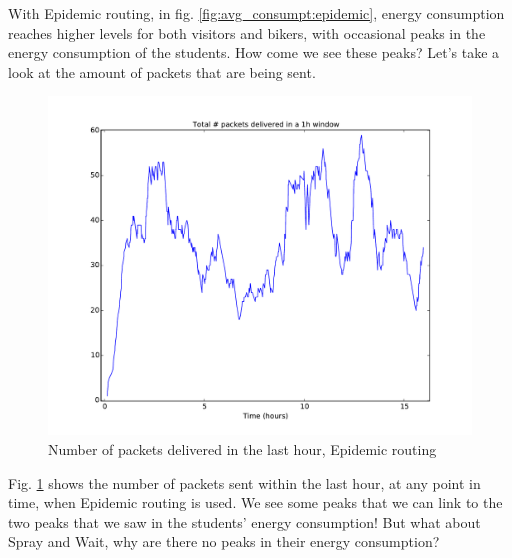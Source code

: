 \documentclass[conference]{IEEEtran}
\begin{document}
With Epidemic routing, in fig. \ref{fig:avg_consumpt:epidemic}, energy consumption reaches higher levels for both visitors and bikers, with occasional peaks in the energy consumption of the students. How come we see these peaks? Let's take a look at the amount of packets that are being sent.

\begin{figure}
  \includegraphics[scale=0.25, center]{../one_1.5.1-RC2/plots/Epidemic_NUM_DELIVERED_PKTS_IN_WND.pdf}
  \caption{Number of packets delivered in the last hour, Epidemic routing}
  \label{fig:pkts_in_wnd:epidemic}
\end{figure}

Fig. \ref{fig:pkts_in_wnd:epidemic} shows the number of packets sent within the last hour, at any point in time, when Epidemic routing is used. We see some peaks that we can link to the two peaks that we saw in the students' energy consumption! But what about Spray and Wait, why are there no peaks in their energy consumption?
\end{document}

